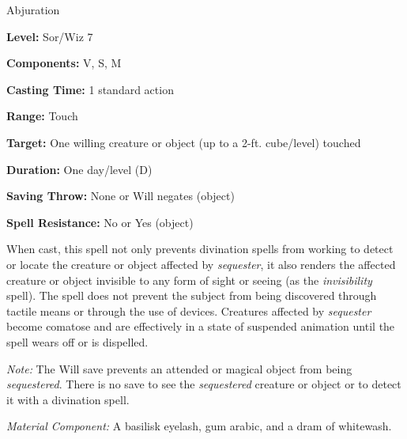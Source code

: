 
Abjuration

\textbf{Level:} Sor/Wiz 7

\textbf{Components:} V, S, M

\textbf{Casting Time:} 1 standard action

\textbf{Range:} Touch

\textbf{Target:} One willing creature or object (up to a 2-ft. cube/level) touched

\textbf{Duration:} One day/level (D)

\textbf{Saving Throw:} None or Will negates (object)

\textbf{Spell Resistance:} No or Yes (object)

When cast, this spell not only prevents divination spells from working to detect 
or locate the creature or object affected by \textit{sequester}, it also renders 
the affected creature or object invisible to any form of sight or seeing (as the 
\textit{invisibility} spell). The spell does not prevent the subject from being 
discovered through tactile means or through the use of devices. Creatures affected 
by \textit{sequester} become comatose and are effectively in a state of suspended 
animation until the spell wears off or is dispelled.

\textit{Note:} The Will save prevents an attended or magical object from being 
\textit{sequestered}. There is no save to see the \textit{sequestered} creature 
or object or to detect it with a divination spell.

\textit{Material Component:} A basilisk eyelash, gum arabic, and a dram of whitewash.

